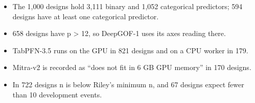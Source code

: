 \documentclass[
  10pt,
]{article}
\providecommand{\tightlist}{%
  \setlength{\itemsep}{0pt}\setlength{\parskip}{0pt}}
\begin{document}
\begin{itemize}
\tightlist
\item
  The 1,000 designs hold 3,111 binary and 1,052 categorical
  predictors; 594 designs have at least one categorical
  predictor.
\item
  658 designs have p \textgreater{} 12, so DeepGOF-1 uses
  its axes reading there.
\item
  TabPFN-3.5 runs on the GPU in 821 designs and on a CPU
  worker in 179.
\item
  Mitra-v2 is recorded as ``does not fit in 6 GB GPU
  memory'' in 170 designs.
\item
  In 722 designs n is below Riley's minimum n, and 67
  designs expect fewer than 10 development events.
\end{itemize}
\end{document}
